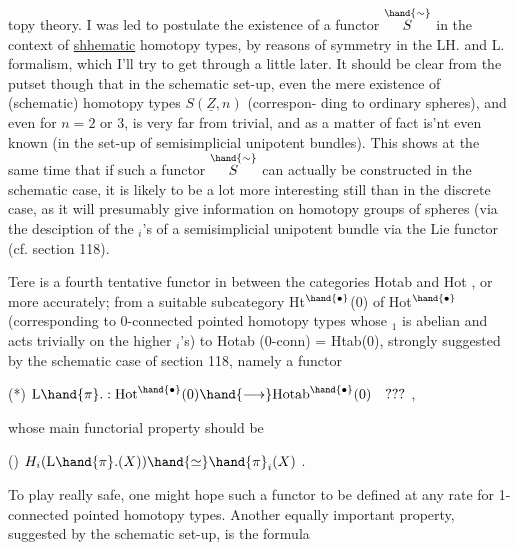 
topy theory.   I was led to postulate the existence of a functor $\overset{\hand{\sim}}{S}$  in
the context of \uline{shhematic} homotopy types,  by reasons of symmetry in the
LH.  and L\hand{$\pi$}. formalism,  which I'll try to get through a little later.
It should be clear from the putset though that in the schematic set-up,
even the mere existence of (schematic) homotopy types $S(\underline{Z},n)$  (correspon-%
ding to ordinary spheres),  and  even for $n=2$ or $3$, is very far from
trivial,  and as a matter of fact is'nt even known (in the set-up of
semisimplicial unipotent bundles).  This shows at the same time that if
such a functor $\overset{\hand{\sim}}{S}$ can actually be constructed in the schematic case,  it is
likely to be a lot more interesting still than in the discrete case,  as
it will presumably give information on homotopy groups of spheres (via the
desciption of the \hand{$\pi$}$_i$'s  of a semisimplicial unipotent bundle via the Lie
functor  (cf. section 118)\hand{)}.

Tere  is a fourth tentative functor in between the categories
Hotab  and  Hot ,  or more accurately;  from a suitable subcategory
Ht$^\hand{\bullet}$(0)  of Hot$^\hand{\bullet}$  (corresponding to 0-connected pointed homotopy types
whose \hand{$\pi$}$_1$ is abelian and acts trivially on the higher \hand{$\pi$}$_i$'s) to
Hotab (0-conn) = Htab(0),  strongly suggested by the schematic case of
section 118,  namely a functor

(*) \qquad $\mathrm{L}\hand{\pi}. : \mathrm{Hot}^\hand{\bullet}(0) \hand{\longrightarrow} \mathrm{Hotab}^\hand{\bullet}(0) \quad ???$  ,

whose main functorial property should be

() \qquad $H_i(\mathrm{L}\hand{\pi}.(X)) \hand{\simeq} \hand{\pi}_i(X)$ \quad {} .

To play really safe,  one might hope such a functor to be defined at any
rate for 1-connected pointed homotopy types.  Another equally important
property, suggested by the schematic set-up, is the formula

